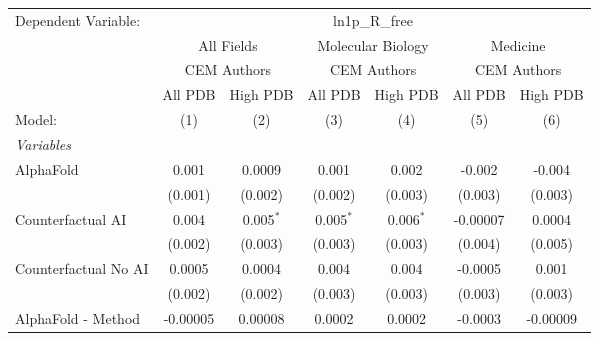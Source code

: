 \begingroup
\centering
\begin{tabular}{lcccccc}
   \tabularnewline \midrule \midrule
   Dependent Variable: & \multicolumn{6}{c}{ln1p\_R\_free}\\
 & \multicolumn{2}{c}{All Fields} & \multicolumn{2}{c}{Molecular Biology} & \multicolumn{2}{c}{Medicine} \\
\cmidrule(lr){2-3} \cmidrule(lr){4-5} \cmidrule(lr){6-7}
 & \multicolumn{2}{c}{CEM Authors} & \multicolumn{2}{c}{CEM Authors} & \multicolumn{2}{c}{CEM Authors} \\
\cmidrule(lr){2-3} \cmidrule(lr){4-5} \cmidrule(lr){6-7}
 & \multicolumn{1}{c}{All PDB} & \multicolumn{1}{c}{High PDB} & \multicolumn{1}{c}{All PDB} & \multicolumn{1}{c}{High PDB} & \multicolumn{1}{c}{All PDB} & \multicolumn{1}{c}{High PDB} \\
\cmidrule(lr){2-2} \cmidrule(lr){3-3} \cmidrule(lr){4-4} \cmidrule(lr){5-5} \cmidrule(lr){6-6} \cmidrule(lr){7-7}
   Model:                                                     & (1)             & (2)             & (3)           & (4)           & (5)            & (6)\\  
   \midrule
   \emph{Variables}\\
   AlphaFold                                                  & 0.001           & 0.0009          & 0.001         & 0.002         & -0.002         & -0.004\\   
                                                              & (0.001)         & (0.002)         & (0.002)       & (0.003)       & (0.003)        & (0.003)\\   
   Counterfactual AI                                          & 0.004           & 0.005$^{*}$     & 0.005$^{*}$   & 0.006$^{*}$   & -0.00007       & 0.0004\\   
                                                              & (0.002)         & (0.003)         & (0.003)       & (0.003)       & (0.004)        & (0.005)\\   
   Counterfactual No AI                                       & 0.0005          & 0.0004          & 0.004         & 0.004         & -0.0005        & 0.001\\   
                                                              & (0.002)         & (0.002)         & (0.003)       & (0.003)       & (0.003)        & (0.003)\\   
   AlphaFold - Method                                         & -0.00005        & 0.00008         & 0.0002        & 0.0002        & -0.0003        & -0.00009\\   

\end{tabular}
